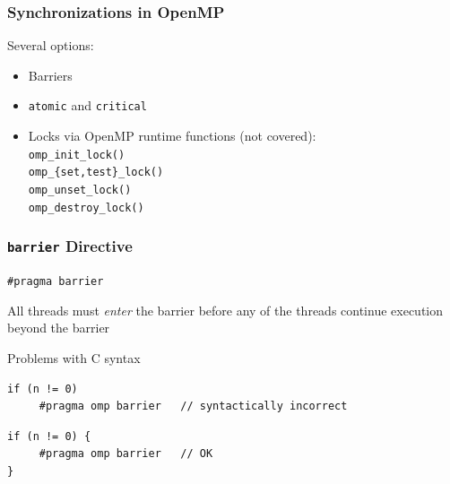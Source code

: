 \documentclass{beamer}
\begin{document}

\begin{frame}
  \frametitle{Synchronizations in OpenMP}

Several options:
  \begin{itemize}
  \item Barriers
  \item \texttt{atomic} and \texttt{critical}
  \item Locks via OpenMP runtime functions (not covered): \\
    {\tt omp\_init\_lock()}\\
    {\tt omp\_\{set,test\}\_lock()}\\
    {\tt omp\_unset\_lock()}\\
    {\tt omp\_destroy\_lock()}
  \end{itemize}
\end{frame}


\begin{frame}[fragile=singleslide]
  \frametitle{\texttt{barrier} Directive } 

  \begin{framed}
    {\tt \#pragma barrier}
  \end{framed}
  
  \bigskip

  All threads must \emph{enter} the barrier before any of the threads continue
  execution beyond the barrier

  \bigskip
  
\begin{alertblock}{Problems with C syntax}

\begin{verbatim}
if (n != 0) 
     #pragma omp barrier   // syntactically incorrect
\end{verbatim}

\bigskip
   
\begin{verbatim}
if (n != 0) {
     #pragma omp barrier   // OK
} 
\end{verbatim}
\end{alertblock}

\end{frame}
\end{document}
